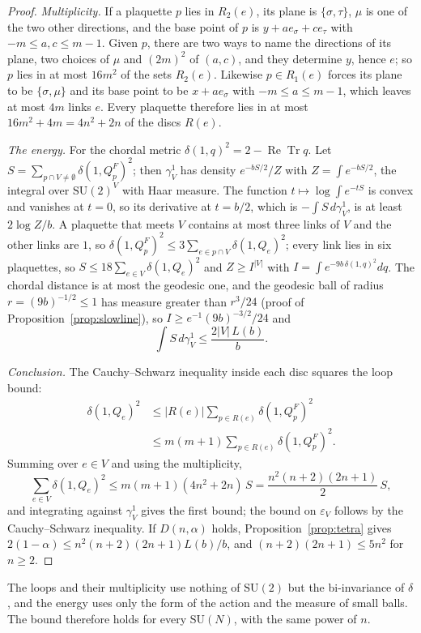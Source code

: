 \documentclass[11pt]{amsart}
\theoremstyle{definition}
\theoremstyle{remark}
\numberwithin{equation}{section}
\newcommand{\SU}{\mathrm{SU}}
\newcommand{\ReTr}{\operatorname{Re}\operatorname{Tr}}
\begin{document}
\begin{proof}
\emph{Multiplicity.} If a plaquette $p$ lies in $R_2(e)$, its plane is
$\{\sigma,\tau\}$, $\mu$ is one of the two other directions, and the base point
of $p$ is $y+ae_\sigma+ce_\tau$ with $-m\le a,c\le m-1$. Given $p$, there are
two ways to name the directions of its plane, two choices of $\mu$ and $(2m)^2$
of $(a,c)$, and they determine $y$, hence $e$; so $p$ lies in at most $16m^2$
of the sets $R_2(e)$. Likewise $p\in R_1(e)$ forces its plane to be
$\{\sigma,\mu\}$ and its base point to be $x+ae_\sigma$ with $-m\le a\le m-1$,
which leaves at most $4m$ links $e$. Every plaquette therefore lies in at most
$16m^2+4m=4n^2+2n$ of the discs $R(e)$.

\emph{The energy.} For the chordal metric $\delta(1,q)^2=2-\ReTr q$. Let
$S=\sum_{p\cap V\ne\emptyset}\delta(1,Q^F_p)^2$; then $\gamma^1_V$ has density
$e^{-bS/2}/Z$ with $Z=\int e^{-bS/2}$, the integral over $\SU(2)^V$ with Haar
measure. The function $t\mapsto\log\int e^{-tS}$ is convex and vanishes at
$t=0$, so its derivative at $t=b/2$, which is $-\int S\,d\gamma^1_V$, is at least
$2\log Z/b$. A plaquette that meets $V$ contains at most three links of $V$ and
the other links are $1$, so $\delta(1,Q^F_p)^2\le3\sum_{e\in p\cap V}
\delta(1,Q_e)^2$; every link lies in six plaquettes, so
$S\le18\sum_{e\in V}\delta(1,Q_e)^2$ and $Z\ge I^{|V|}$ with
$I=\int e^{-9b\,\delta(1,q)^2}dq$. The chordal distance is at most the geodesic
one, and the geodesic ball of radius $r=(9b)^{-1/2}\le1$ has measure greater
than $r^3/24$ (proof of Proposition~\ref{prop:slowline}), so $I\ge
e^{-1}(9b)^{-3/2}/24$ and
\[
\int S\,d\gamma^1_V\le\frac{2|V|\,L(b)}b .
\]

\emph{Conclusion.} The Cauchy--Schwarz inequality inside each disc squares
the loop bound:
\[
\begin{aligned}
\delta(1,Q_e)^2&\le|R(e)|\sum_{p\in R(e)}\delta(1,Q^F_p)^2\\
&\le m(m+1)\sum_{p\in R(e)}\delta(1,Q^F_p)^2 .
\end{aligned}
\]
Summing over
$e\in V$ and using the multiplicity,
\[
\sum_{e\in V}\delta(1,Q_e)^2\le m(m+1)(4n^2+2n)\,S
=\frac{n^2(n+2)(2n+1)}2\,S ,
\]
and integrating against $\gamma^1_V$ gives the first bound; the bound on
$\varepsilon_V$ follows by the Cauchy--Schwarz inequality. If $D(n,\alpha)$
holds, Proposition~\ref{prop:tetra} gives $2(1-\alpha)\le
n^2(n+2)(2n+1)L(b)/b$, and $(n+2)(2n+1)\le5n^2$ for $n\ge2$.
\end{proof}

The loops and their multiplicity use nothing of $\SU(2)$ but the
bi-invariance of $\delta$, and the energy uses only the form of the action and
the measure of small balls. The bound therefore holds for every $\SU(N)$,
with the same power of $n$.
\end{document}
